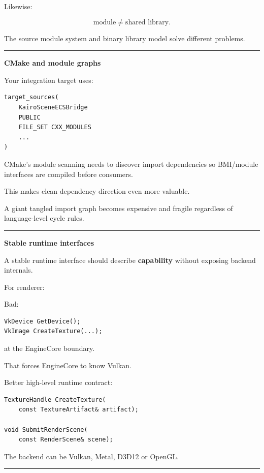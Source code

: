 Likewise:

\[
\boxed{
\text{module} \neq \text{shared library}.
}
\]

The source module system and binary library model solve different problems.

\begin{center}\rule{0.5\linewidth}{0.5pt}\end{center}

\textbf{CMake and module graphs}

Your integration target uses:

\begin{verbatim}
target_sources(
    KairoSceneECSBridge
    PUBLIC
    FILE_SET CXX_MODULES
    ...
)
\end{verbatim}

CMake's module scanning needs to discover import dependencies so BMI/module interfaces are compiled before consumers.

This makes clean dependency direction even more valuable.

A giant tangled import graph becomes expensive and fragile regardless of language-level cycle rules.

\begin{center}\rule{0.5\linewidth}{0.5pt}\end{center}

\textbf{Stable runtime interfaces}

A stable runtime interface should describe \textbf{capability} without exposing backend internals.

For renderer:

Bad:

\begin{verbatim}
VkDevice GetDevice();
VkImage CreateTexture(...);
\end{verbatim}

at the EngineCore boundary.

That forces EngineCore to know Vulkan.

Better high-level runtime contract:

\begin{verbatim}
TextureHandle CreateTexture(
    const TextureArtifact& artifact);

void SubmitRenderScene(
    const RenderScene& scene);
\end{verbatim}

The backend can be Vulkan, Metal, D3D12 or OpenGL.

\begin{center}\rule{0.5\linewidth}{0.5pt}\end{center}

